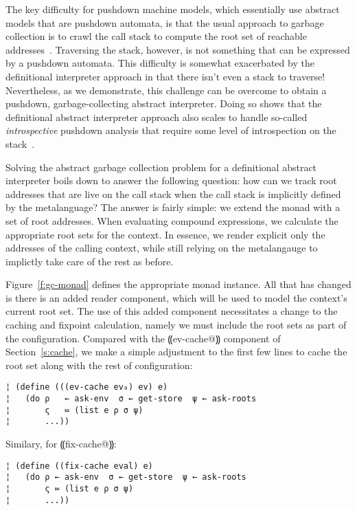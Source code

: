 The key difficulty for pushdown machine models, which essentially use
abstract models that are pushdown automata, is that the usual approach
to garbage collection is to crawl the call stack to compute the root
set of reachable addresses~\cite{dvanhorn:Morrisett1995Abstract}.
Traversing the stack, however, is not something that can be expressed
by a pushdown automata.
%
This difficulty is somewhat exacerbated by the definitional
interpreter approach in that there isn't even a stack to traverse!
Nevertheless, as we demonstrate, this challenge can be overcome to
obtain a pushdown, garbage-collecting abstract interpreter.
%
Doing so shows that the definitional abstract interpreter approach
also scales to handle so-called \emph{introspective} pushdown analysis
that require some level of introspection on the
stack~\cite{dvanhorn:Earl2012Introspective,dvanhorn:Johnson2014Pushdown}.

Solving the abstract garbage collection problem for a definitional
abstract interpreter boils down to answer the following question: how
can we track root addresses that are live on the call stack when the
call stack is implicitly defined by the metalanguage?  The answer is
fairly simple: we extend the monad with a set of root addresses.  When
evaluating compound expressions, we calculate the appropriate root
sets for the context.  In essence, we render explicit only the
addresses of the calling context, while still relying on the
metalangauge to implictly take care of the rest as before.

Figure~\ref{f:gc-monad} defines the appropriate monad instance.  All
that has changed is there is an added reader component, which will be
used to model the context's current root set.
%
The use of this added component necessitates a change to the caching
and fixpoint calculation, namely we must include the root sets as part
of the configuration.  Compared with the ⸨ev-cache@⸩ component of
Section~\ref{s:cache}, we make a simple adjustment to the first few
lines to cache the root set along with the rest of configuration:
\begin{lstlisting}
¦ (define (((ev-cache ev₀) ev) e)
¦   (do ρ   ← ask-env  σ ← get-store  ψ ← ask-roots
¦       ς   ≔ (list e ρ σ ψ)
¦       ...))
\end{lstlisting}
Similary, for ⸨fix-cache@⸩:
\begin{lstlisting}
¦ (define ((fix-cache eval) e)  
¦   (do ρ ← ask-env  σ ← get-store  ψ ← ask-roots
¦       ς ≔ (list e ρ σ ψ)
¦       ...))
\end{lstlisting}

